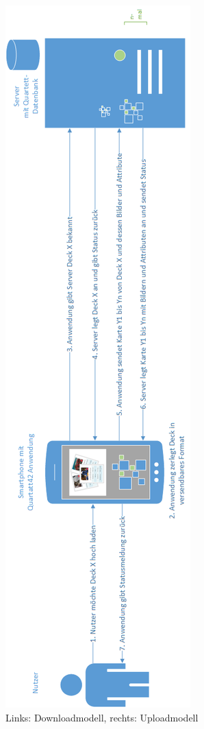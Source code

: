 \begin{figure}[htp]
\begin{minipage}{.45\textwidth}
\end{minipage}%
\begin{minipage}{.45\textwidth}
  \centering
  \includegraphics[width=.95\linewidth]{img/modelle/uploadmodell.png}
\end{minipage}%
\caption{Links: Downloadmodell, rechts: Uploadmodell }
\label{figure:implementierungdownundupload}
\end{figure}

